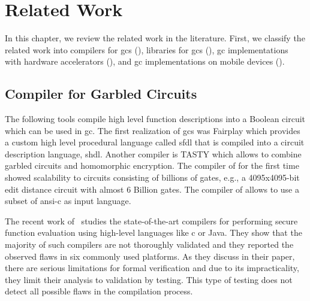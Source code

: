 \chapter{Related Work}\label{chap:related}
In this chapter, we review the related work in the literature.
First, we classify the related work into compilers for \acrshort{gc}s (), libraries for \acrshort{gc}s (), \acrshort{gc} implementations with hardware accelerators (), and \acrshort{gc} implementations on mobile devices ().

\section{Compiler for Garbled Circuits}\label{sec:related-compiler}
The following tools compile high level function descriptions into a Boolean circuit which can be used in \acrshort{gc}.
The first realization of \acrshort{gc}s was Fairplay \cite{malkhi2004fairplay} which provides a custom high level procedural language called \acrfull{sfdl} that is compiled into a circuit description language, \acrfull{shdl}.
Another compiler is TASTY \cite{henecka2010tasty} which allows to combine garbled circuits and homomorphic encryption.
The compiler of \cite{kreuter2012billion} for the first time showed scalability to circuits consisting of billions of gates, e.g., a 4095x4095-bit edit distance circuit with almost 6 Billion gates.
The compiler of \cite{franz2014cbmc} allows to use a subset of \acrshort{ansi}-\gls{c} as input language.

The recent work of~\cite{mood2016frigate} studies the state-of-the-art compilers for performing secure function evaluation using high-level languages like \gls{c} or Java.
They show that the majority of such compilers are not thoroughly validated and they reported the observed flaws in six commonly used platforms.
As they discuss in their paper, there are serious limitations for formal verification and due to its impracticality, they limit their analysis to validation by testing.
This type of testing does not detect all possible flaws in the compilation process.

